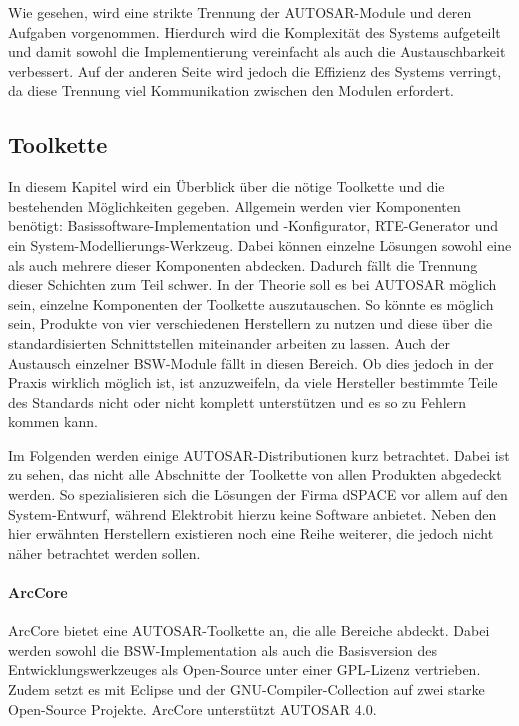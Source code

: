 \documentclass[
  a4paper,					    %
  twoside,
  DIV=calc,     				%
  bibliography=totoc,
  cleardoublepage=empty,
  ngerman,     					%
  final       					%
]{scrbook}
\begin{document}
Wie gesehen, wird eine strikte Trennung der AUTOSAR-Module und deren Aufgaben vorgenommen. Hierdurch wird die Komplexität des Systems aufgeteilt und damit sowohl die Implementierung vereinfacht als auch die Austauschbarkeit verbessert. Auf der anderen Seite wird jedoch die Effizienz des Systems verringt, da diese Trennung viel Kommunikation zwischen den Modulen erfordert.


\subsection{Toolkette}
\label{sec:Toolkette}
In diesem Kapitel wird ein Überblick über die nötige Toolkette und die bestehenden Möglichkeiten gegeben. Allgemein werden vier Komponenten benötigt: Basissoftware-Implementation und -Konfigurator, RTE-Generator und ein System-Modellierungs-Werkzeug. Dabei können einzelne Lösungen sowohl eine als auch mehrere dieser Komponenten abdecken. Dadurch fällt die Trennung dieser Schichten zum Teil schwer. In der Theorie soll es bei AUTOSAR möglich sein, einzelne Komponenten der Toolkette auszutauschen. So könnte es möglich sein, Produkte von vier verschiedenen Herstellern zu nutzen und diese über die standardisierten Schnittstellen miteinander arbeiten zu lassen. Auch der Austausch einzelner BSW-Module fällt in diesen Bereich. Ob dies jedoch in der Praxis wirklich möglich ist, ist anzuzweifeln, da viele Hersteller bestimmte Teile des Standards nicht oder nicht komplett unterstützen und es so zu Fehlern kommen kann.

Im Folgenden werden einige AUTOSAR-Distributionen kurz betrachtet\cite{wiki:autosar}. Dabei ist zu sehen, das nicht alle Abschnitte der Toolkette von allen Produkten abgedeckt werden. So spezialisieren sich die Lösungen der Firma dSPACE vor allem auf den System-Entwurf, während Elektrobit hierzu keine Software anbietet. Neben den hier erwähnten Herstellern existieren noch eine Reihe weiterer, die jedoch nicht näher betrachtet werden sollen.

\paragraph{ArcCore}
ArcCore bietet eine AUTOSAR-Toolkette an, die alle Bereiche abdeckt. Dabei werden sowohl die BSW-Implementation als auch die Basisversion des Entwicklungswerkzeuges als Open-Source unter einer GPL-Lizenz vertrieben. Zudem setzt es mit Eclipse und der GNU-Compiler-Collection auf zwei starke Open-Source Projekte. ArcCore unterstützt AUTOSAR 4.0.
\end{document}
